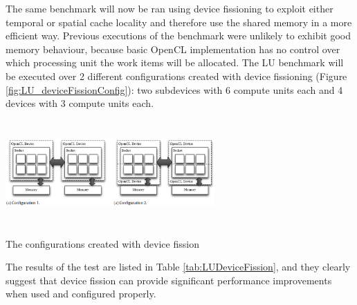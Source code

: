 The same benchmark will now be ran using device fissioning to exploit either temporal or spatial cache locality and therefore use the shared memory in a more efficient way. Previous executions of the benchmark were unlikely to exhibit good memory behaviour, because basic OpenCL implementation has no control over which processing unit the work items will be allocated.
The LU benchmark will be executed over 2 different configurations created with device fissioning (Figure \ref{fig:LU_deviceFissionConfig}): two subdevices with 6 compute units each and 4 devices with 3 compute units each.

\begin{figurehere}
 \centering
 \includegraphics[width=8cm, height=4cm]{./eps/LU_deviceFissionConfig.eps}
 \caption{The configurations created with device fission}
 \label{fig:LU_deviceFissionConfig}
\end{figurehere}

The results of the test are listed in Table \ref{tab:LUDeviceFission}, and they clearly suggest that device fission can provide significant performance improvements when used and configured properly. \\

